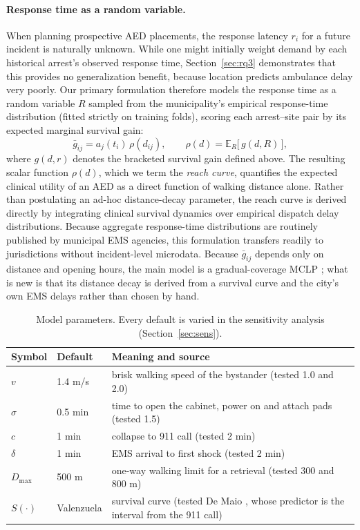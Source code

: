 \documentclass[11pt]{article}
\begin{document}
\paragraph{Response time as a random variable.} When planning prospective AED placements, the response latency $r_i$ for a future incident is naturally unknown. While one might initially weight demand by each historical arrest's observed response time, Section~\ref{sec:rq3} demonstrates that this provides no generalization benefit, because location predicts ambulance delay very poorly. Our primary formulation therefore models the response time as a random variable $R$ sampled from the municipality's empirical response-time distribution (fitted strictly on training folds), scoring each arrest--site pair by its expected marginal survival gain:
\[
\bar g_{ij} = a_j(t_i)\,\rho(d_{ij}),\qquad \rho(d) = \mathbb{E}_R\bigl[\,g(d,R)\,\bigr],
\]
where $g(d,r)$ denotes the bracketed survival gain defined above. The resulting scalar function $\rho(d)$, which we term the \emph{reach curve}, quantifies the expected clinical utility of an AED as a direct function of walking distance alone. Rather than postulating an ad-hoc distance-decay parameter, the reach curve is derived directly by integrating clinical survival dynamics over empirical dispatch delay distributions. Because aggregate response-time distributions are routinely published by municipal EMS agencies, this formulation transfers readily to jurisdictions without incident-level microdata. Because $\bar g_{ij}$ depends only on distance and opening hours, the main model is a gradual-coverage MCLP \cite{chan2016,buter2024}; what is new is that its distance decay is derived from a survival curve and the city's own EMS delays rather than chosen by hand.

\begin{table}[htbp]
\centering\small
\begin{tabular}{llp{8.2cm}}
\toprule
Symbol & Default & Meaning and source\\
\midrule
$v$ & 1.4 m/s & brisk walking speed of the bystander (tested 1.0 and 2.0)\\
$\sigma$ & 0.5 min & time to open the cabinet, power on and attach pads (tested 1.5)\\
$c$ & 1 min & collapse to 911 call (tested 2 min)\\
$\delta$ & 1 min & EMS arrival to first shock (tested 2 min)\\
$D_{\max}$ & 500 m & one-way walking limit for a retrieval (tested 300 and 800 m)\\
$S(\cdot)$ & Valenzuela & survival curve \cite{valenzuela1997,erkut2008} (tested De Maio \cite{demaio2003}, whose predictor is the interval from the 911 call)\\
\bottomrule
\end{tabular}
\caption{Model parameters. Every default is varied in the sensitivity analysis (Section~\ref{sec:sens}).}
\label{tab:params}
\end{table}
\end{document}
